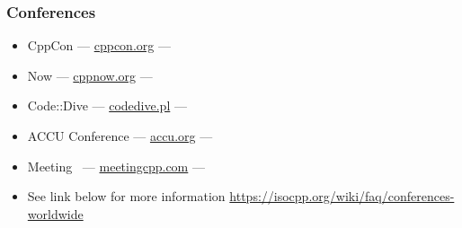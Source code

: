 \documentclass[compress]{beamer}
\begin{document}
\begin{frame}
  \frametitle{Conferences}
  \begin{itemize}
    \item CppCon --- \href{https://cppcon.org/}{cppcon.org} --- 
    \item \cpp Now --- \href{https://cppnow.org/}{cppnow.org} --- 
    \item Code::Dive --- \href{https://codedive.pl/}{codedive.pl} --- 
    \item ACCU Conference --- \href{https://accu.org/}{accu.org}  --- 
    \item Meeting \cpp\ --- \href{https://meetingcpp.com/}{meetingcpp.com} --- 
    \item See link below for more information
          \url{https://isocpp.org/wiki/faq/conferences-worldwide}
  \end{itemize}
\end{frame}
\end{document}
